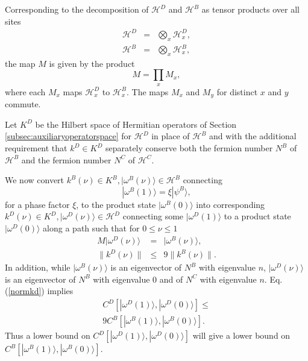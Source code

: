 \documentclass[twocolumn,amsmath,amssymb]{revtex4-1}
\begin{document}
Corresponding to the decomposition of $\mathcal{H}^D$ and $\mathcal{H}^B$ as tensor
products over all sites
\begin{subequations}
  \begin{eqnarray}
  \label{hdasproduct}
  \mathcal{H}^D &=& \bigotimes_x \mathcal{H}^D_x, \\
  \label{hbasproduct}
  \mathcal{H}^B &=& \bigotimes_x \mathcal{H}^B_x, 
  \end{eqnarray}
\end{subequations}
the map $M$ is given by the product
\begin{equation}
  \label{masproduct}
  M = \prod_x M_x,
\end{equation}
where each $M_x$  maps $\mathcal{H}^D_x$ to $\mathcal{H}^B_x$. The
maps $M_x$ and $M_y$ for distinct $x$ and $y$ commute.



Let $K^D$ be 
the Hilbert  
space of Hermitian operators of Section \ref{subsec:auxiliaryoperatorspace}
for $\mathcal{H}^D$ in place of $\mathcal{H}^B$ and with the additional requirement
that $k^D \in K^D$
separately conserve both the fermion number $N^B$
of $\mathcal{H}^B$ and the fermion number $N^C$ of $\mathcal{H}^C$. 

We now convert $k^B(\nu) \in K^B, |\omega^B(\nu) \rangle  \in \mathcal{H}^B$
connecting
\begin{equation}
  \label{psibomega}
 |\omega^B(1) \rangle  = \xi |\psi^B \rangle ,
\end{equation}
for a phase factor $\xi$, to the product state $|\omega^B(0) \rangle $ into
corresponding $k^D(\nu) \in K^D, |\omega^D(\nu) \rangle  \in \mathcal{H}^D$
connecting some $|\omega^D(1) \rangle $
to a product state $|\omega^D(0) \rangle $
along a path such that for $0 \le \nu \le 1$
\begin{subequations}
  \begin{eqnarray}
  \label{omegaw}
  M |\omega^D(\nu) \rangle  &=& |\omega^B(\nu) \rangle , \\
  \label{normkd}
  \parallel k^D(\nu) \parallel &\le& 9 \parallel k^B(\nu) \parallel.
  \end{eqnarray}
\end{subequations}
In addition, while $|\omega^B(\nu) \rangle $ is an eigenvector
of $N^B$ with eigenvalue $n$, $|\omega^D(\nu) \rangle $ is an eigenvector
of $N^B$ with eigenvalue 0 and of $N^C$ with eigenvalue $n$.
Eq. (\ref{normkd}) implies
\begin{multline}
  \label{complexityd}
  C^D[ |\omega^D(1) \rangle , |\omega^D( 0) \rangle ] \le \\
  9 C^B[ |\omega^B(1) \rangle , |\omega^B( 0) \rangle ]. 
\end{multline}
Thus a lower bound on $C^D[ |\omega^D(1) \rangle , |\omega^D( 0) \rangle ]$ will give a
lower bound on $C^B[ |\omega^B(1) \rangle , |\omega^B( 0) \rangle ]$.
\end{document}
